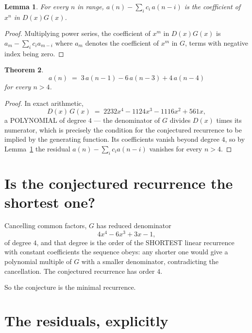 \documentclass[11pt,a4paper]{article}
\theoremstyle{plain}
\newtheorem{theorem}{Theorem}
\newtheorem{lemma}[theorem]{Lemma}
\theoremstyle{definition}
\begin{document}
\begin{lemma}\label{lem:key}
For every $n$ in range, $a(n)-\sum_i c_i\,a(n-i)$ is the coefficient of $x^{n}$ in
$D(x)G(x)$.
\end{lemma}

\begin{proof}
Multiplying power series, the coefficient of $x^{m}$ in $D(x)G(x)$ is
$a_m-\sum_i c_i a_{m-i}$ where $a_m$ denotes the coefficient of $x^{m}$ in $G$, terms with
negative index being zero.
\end{proof}

\begin{theorem}
\[
a(n)\;=\;3\,a(n-1) - 6\,a(n-3) + 4\,a(n-4)
\]
for every $n>4$.
\end{theorem}

\begin{proof}
In exact arithmetic,
\[
D(x)\,G(x)\;=\;2232 x^{4} - 1124 x^{3} - 1116 x^{2} + 561 x,
\]
a POLYNOMIAL of degree $4$ --- the denominator of $G$ divides $D(x)$ times its numerator,
which is precisely the condition for the conjectured recurrence to be implied by the
generating function. Its coefficients vanish beyond degree $4$, so by
Lemma~\ref{lem:key} the residual $a(n)-\sum_ic_ia(n-i)$ vanishes for every
$n>4$.
\end{proof}

\section{Is the conjectured recurrence the shortest one?}

Cancelling common factors, $G$ has reduced denominator
\[
4 x^{4} - 6 x^{3} + 3 x - 1,
\]
of degree $4$, and that degree is the order of the SHORTEST linear recurrence with
constant coefficients the sequence obeys: any shorter one would give a polynomial multiple of
$G$ with a smaller denominator, contradicting the cancellation. The conjectured recurrence has
order $4$.

So the conjecture is the minimal recurrence.

\section{The residuals, explicitly}
\end{document}
